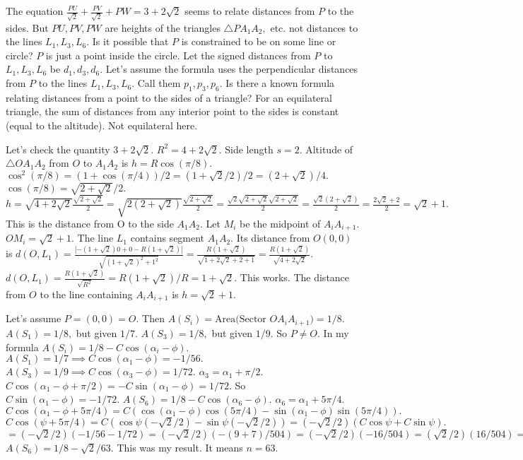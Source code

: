 The equation $\frac{PU}{\sqrt{2}} + \frac{PV}{\sqrt{2}} + PW = 3+2\sqrt2$ seems to relate distances from $P$ to the sides. But $PU, PV, PW$ are heights of the triangles $\triangle PA_1A_2,$ etc. not distances to the lines $L_1, L_3, L_6.$ 
Is it possible that $P$ is constrained to be on some line or circle? $P$ is just a point inside the circle. 
Let the signed distances from $P$ to $L_1, L_3, L_6$ be $d_1, d_3, d_6.$ 
Let's assume the formula uses the perpendicular distances from $P$ to the lines $L_1, L_3, L_6.$ Call them $p_1, p_3, p_6.$ 
Is there a known formula relating distances from a point to the sides of a triangle? 
For an equilateral triangle, the sum of distances from any interior point to the sides is constant (equal to the altitude). Not equilateral here.

Let's check the quantity $3+2\sqrt{2}.$ $R^2 = 4+2\sqrt{2}.$ Side length $s=2.$ Altitude of $\triangle OA_1A_2$ from $O$ to $A_1A_2$ is $h = R \cos(\pi/8).$ $\cos^2(\pi/8) = (1+\cos(\pi/4))/2 = (1+\sqrt{2}/2)/2 = (2+\sqrt{2})/4.$ $\cos(\pi/8) = \sqrt{2+\sqrt{2}}/2.$ 
$h = \sqrt{4+2\sqrt{2}} \frac{\sqrt{2+\sqrt{2}}}{2} = \sqrt{2(2+\sqrt{2})} \frac{\sqrt{2+\sqrt{2}}}{2} = \frac{\sqrt{2}\sqrt{2+\sqrt{2}}\sqrt{2+\sqrt{2}}}{2} = \frac{\sqrt{2}(2+\sqrt{2})}{2} = \frac{2\sqrt{2}+2}{2} = \sqrt{2}+1.$ This is the distance from O to the side $A_1A_2.$ 
Let $M_i$ be the midpoint of $A_iA_{i+1}.$ $OM_i = \sqrt{2}+1.$ 
The line $L_1$ contains segment $A_1A_2.$ Its distance from $O(0,0)$ is $d(O, L_1) = \frac{|-(1+\sqrt{2})0 + 0 - R(1+\sqrt{2})|}{\sqrt{(1+\sqrt{2})^2+1^2}} = \frac{R(1+\sqrt{2})}{\sqrt{1+2\sqrt{2}+2+1}} = \frac{R(1+\sqrt{2})}{\sqrt{4+2\sqrt{2}}}.$ 
$d(O, L_1) = \frac{R(1+\sqrt{2})}{\sqrt{R^2}} = R(1+\sqrt{2})/R = 1+\sqrt{2}.$ This works. The distance from $O$ to the line containing $A_iA_{i+1}$ is $h=\sqrt{2}+1.$

Let's assume $P=(0,0)=O.$ Then $A(S_i) = \text{Area(Sector } OA_iA_{i+1}) = 1/8.$ 
$A(S_1)=1/8,$ but given $1/7.$ $A(S_3)=1/8,$ but given $1/9.$ So $P \neq O.$ 
In my formula $A(S_i) = 1/8 - C \cos(\alpha_i - \phi).$ 
$A(S_1)=1/7 \implies C \cos(\alpha_1 - \phi) = -1/56.$ 
$A(S_3)=1/9 \implies C \cos(\alpha_3 - \phi) = 1/72.$ $\alpha_3 = \alpha_1 + \pi/2.$ $C \cos(\alpha_1 - \phi + \pi/2) = -C \sin(\alpha_1 - \phi) = 1/72.$ So $C \sin(\alpha_1 - \phi) = -1/72.$ 
$A(S_6)=1/8 - C \cos(\alpha_6 - \phi).$ $\alpha_6 = \alpha_1 + 5\pi/4.$ $C \cos(\alpha_1 - \phi + 5\pi/4) = C (\cos(\alpha_1-\phi)\cos(5\pi/4) - \sin(\alpha_1-\phi)\sin(5\pi/4)).$ 
$C \cos(\psi+5\pi/4) = C (\cos\psi (-\sqrt{2}/2) - \sin\psi (-\sqrt{2}/2)) = (-\sqrt{2}/2) (C \cos\psi + C \sin\psi).$ 
$= (-\sqrt{2}/2) (-1/56 - 1/72) = (-\sqrt{2}/2) (- (9+7)/504) = (-\sqrt{2}/2) (-16/504) = (\sqrt{2}/2) (16/504) = (\sqrt{2}/2)(2/63) = \sqrt{2}/63.$ 
$A(S_6) = 1/8 - \sqrt{2}/63.$ This was my result. It means $n=63.$

